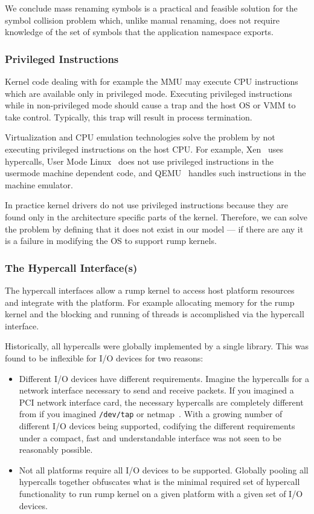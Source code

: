 We conclude mass renaming symbols is a practical and feasible
solution for the symbol collision problem which, unlike manual
renaming, does not require knowledge of the set of symbols that
the application namespace exports.

\subsubsection{Privileged Instructions}
\label{sect:privinst}

Kernel code dealing with for example the MMU may execute CPU
instructions which are available only in privileged mode.  Executing
privileged instructions while in non-privileged mode should cause
a trap and the host OS or VMM to take control.  Typically, this trap
will result in process termination.

Virtualization and CPU emulation technologies solve the problem by
not executing privileged instructions on the host CPU.
For example, Xen~\cite{barham:xen} uses hypercalls, User Mode
Linux~\cite{dike:uml} does not use privileged instructions in the
usermode machine dependent code, and QEMU~\cite{bellard:qemu}
handles such instructions in the machine emulator.

In practice kernel drivers do not use privileged instructions
because they are found only in the architecture specific parts of
the kernel.  Therefore, we can solve the problem by defining that
it does not exist in our model --- if there are any it is a failure
in modifying the OS to support rump kernels.

\subsubsection{The Hypercall Interface(s)}
\label{sect:hypercall}

The hypercall interfaces allow a rump kernel to access host platform
resources and integrate with the platform.  For example allocating
memory for the rump kernel and the blocking and running of threads is
accomplished via the hypercall interface.

Historically, all hypercalls were globally implemented by a single
library.  This was found to be inflexible for I/O devices for two reasons:

\begin{itemize}
\item	Different I/O devices have different requirements.  Imagine
	the hypercalls for a network interface necessary to send and
	receive packets.  If you imagined a PCI network interface
	card, the necessary hypercalls are completely different from
	if you imagined \texttt{/dev/tap} or netmap~\cite{rizzo:netmap}.
	With a growing number of different I/O devices being supported,
	codifying the different requirements under a compact, fast and
	understandable interface was not seen to be reasonably possible.

\item	Not all platforms require all I/O devices to be supported.
	Globally pooling all hypercalls together obfuscates what is
	the minimal required set of hypercall functionality to run rump
	kernel on a given platform with a given set of I/O devices.
\end{itemize}

